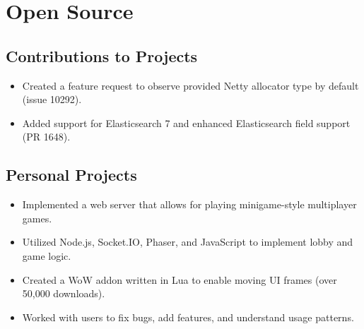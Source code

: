 \documentclass[letterpaper]{resume}
\begin{document}
\begin{minipage}[t]{0.77\columnwidth}
\sectionspace


\section{Open Source}

\subsection{Contributions to Projects}
\vspace{2pt}
\begin{itemize}
\item Created a feature request to observe provided Netty allocator type by default (issue 10292).
\end{itemize}
\vspace{3pt}
\vspace{2pt}
\begin{itemize}
\item Added support for Elasticsearch 7 and enhanced Elasticsearch field support (PR 1648).
\end{itemize}

\sectionspace

\subsection{Personal Projects}
\vspace{2pt}
\begin{itemize}
\item Implemented a web server that allows for playing minigame-style multiplayer games.
\item Utilized Node.js, Socket.IO, Phaser, and JavaScript to implement lobby and game logic.
\end{itemize}
\vspace{3pt}
\vspace{2pt}
\begin{itemize}
\item Created a WoW addon written in Lua to enable moving UI frames (over 50,000 downloads).
\item Worked with users to fix bugs, add features, and understand usage patterns.
\end{itemize}

\sectionspace

\end{minipage}
\end{document}

